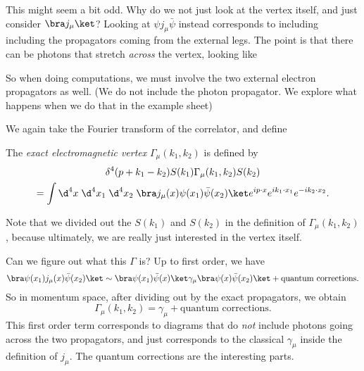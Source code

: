 \documentclass[a4paper]{article}
\begin{document}
This might seem a bit odd. Why do we not just look at the vertex itself, and just consider $\bra j_\mu\ket$? Looking at $\psi j_\mu \bar\psi$ instead corresponds to including including the propagators coming from the external legs. The point is that there can be photons that stretch \emph{across} the vertex, looking like
\begin{center}
\end{center}
So when doing computations, we must involve the two external electron propagators as well. (We do not include the photon propagator. We explore what happens when we do that in the example sheet)

We again take the Fourier transform of the correlator, and define
\begin{defi}
  The \emph{exact electromagnetic vertex} $\Gamma_\mu(k_1, k_2)$ is defined by
  \begin{multline*}
   \delta^4(p + k_1 - k_2) S(k_1) \Gamma_\mu(k_1, k_2) S(k_2) \\
   = \int \d^4 x\; \d^4 x_1\; \d^4 x_2\; \bra j_\mu(x) \psi(x_1) \bar\psi(x_2)\ket e^{ip\cdot x} e^{ik_1 \cdot x_1} e^{-ik_2 \cdot x_2}.
 \end{multline*}
\end{defi}
Note that we divided out the $S(k_1)$ and $S(k_2)$ in the definition of $\Gamma_\mu(k_1, k_2)$, because ultimately, we are really just interested in the vertex itself.

Can we figure out what this $\Gamma$ is? Up to first order, we have
\[
  \bra \psi(x_1) j_\mu(x) \bar\psi(x_2)\ket \sim \bra \psi(x_1) \bar\psi(x)\ket \gamma_\mu \bra \psi(x) \bar\psi(x_2)\ket + \text{quantum corrections}.
\]
So in momentum space, after dividing out by the exact propagators, we obtain
\[
  \Gamma_\mu(k_1, k_2) = \gamma_\mu + \text{quantum corrections}.
\]
This first order term corresponds to diagrams that do \emph{not} include photons going across the two propagators, and just corresponds to the classical $\gamma_\mu$ inside the definition of $j_\mu$. The quantum corrections are the interesting parts.
\end{document}
